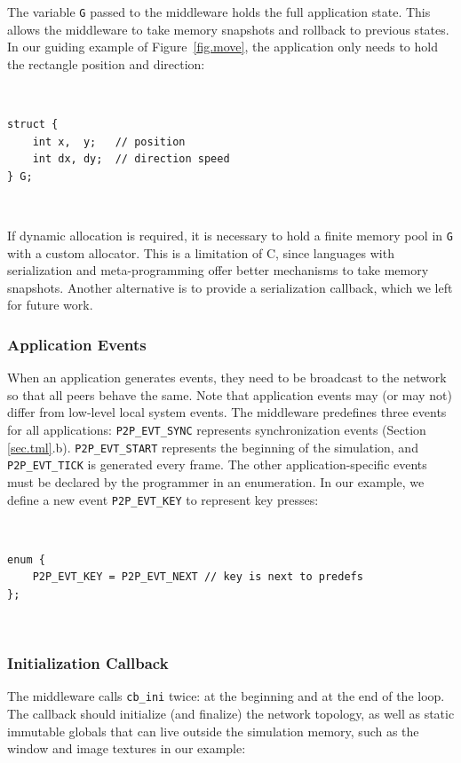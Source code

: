 \documentclass[sn-mathphys,iicol]{sn-jnl}%
\newcommand{\code}[1]  {\texttt{\small{#1}}}
\begin{document}
The variable \code{G} passed to the middleware holds the full application
state.
This allows the middleware to take memory snapshots and rollback to previous
states.
In our guiding example of Figure~\ref{fig.move}, the application only needs to
hold the rectangle position and direction:

{\footnotesize
~
\begin{verbatim}
struct {
    int x,  y;   // position
    int dx, dy;  // direction speed
} G;
\end{verbatim}
~
}

If dynamic allocation is required, it is necessary to hold a finite memory
pool in \code{G} with a custom allocator.
This is a limitation of C, since languages with serialization and
meta-programming offer better mechanisms to take memory snapshots.
Another alternative is to provide a serialization callback, which we left for
future work.

\subsubsection{Application Events}
\label{sec.tml.api.events}

When an application generates events, they need to be broadcast to the network
so that all peers behave the same.
Note that application events may (or may not) differ from low-level local
system events.
%
The middleware predefines three events for all applications:
    \code{P2P\_EVT\_SYNC} represents synchronization events
        (Section \ref{sec.tml}.b).
    \code{P2P\_EVT\_START} represents the beginning of the simulation, and
    \code{P2P\_EVT\_TICK} is generated every frame.
The other application-specific events must be declared by the programmer in an
enumeration.
In our example, we define a new event \code{P2P\_EVT\_KEY} to represent key
presses:

{\footnotesize
~
\begin{verbatim}
enum {
    P2P_EVT_KEY = P2P_EVT_NEXT // key is next to predefs
};
\end{verbatim}
~
}

\subsubsection{Initialization Callback}
\label{sec.tml.api.cb_ini}

The middleware calls \code{cb\_ini} twice: at the beginning and at the end of
the loop.
The callback should initialize (and finalize) the network topology, as well as
static immutable globals that can live outside the simulation memory, such as
the window and image textures in our example:
\end{document}
